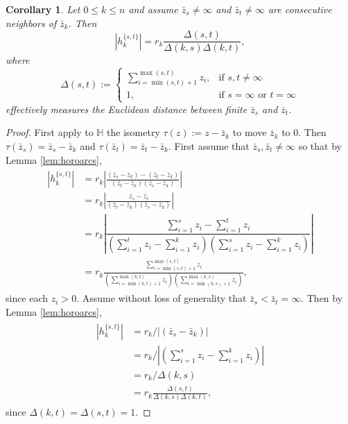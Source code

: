 \documentclass[10pt,a4paper]{article}
\newtheorem{corollary}{Corollary}
\newcommand{\h}[2]{h_{#1}^{\{#2\}}}
\newcommand{\z}[1]{\bar{z}_{#1}}
\newcommand{\len}[1]{\left\lvert #1 \right\rvert}
\begin{document}
\begin{corollary}
\label{cor:horoarcs}
Let $0 \leq k \leq n$ and assume $\z{s} \neq \infty$ and $\z{t} \neq \infty$ are consecutive neighbors of $\z{k}$. Then
\[
    \len{\h{k}{s,t}} = r_k \frac{\Delta(s,t)}{\Delta(k,s)\Delta(k,t)},
\]
where 
\[
    \Delta(s,t) := 
        \begin{cases}
            \displaystyle \sum_{i=\min(s,t)+1}^{\max(s,t)}z_i, & \text{if } s,t \neq  \infty \\
            1, & \text{if } s = \infty \text{ or } t = \infty 
        \end{cases}
\]
effectively measures the Euclidean distance between finite $\z{s}$ and $\z{t}$.
\end{corollary}
\begin{proof}
    First apply to $\mathbb{H}$ the isometry $\tau(z) := z - \z{k}$ to move $\z{k}$ to $0$. Then $\tau(\z{s}) = \z{s} - \z{k}$ and $\tau(\z{t}) = \z{t} - \z{k}$. First assume that $\z{s}, \z{t} \neq \infty$ so that by Lemma \ref{lem:horoarcs}, 
    \begin{align*}
        \begin{aligned}
            \len{\h{k}{s,t}} & = r_k \left\lvert \frac{(\z{s}-\z{k}) - (\z{t}-\z{k})}{(\z{t}-\z{k})(\z{s}-\z{k})} \right\rvert \\
            & = r_k \left\lvert \frac{\z{s} - \z{t}}{(\z{t}-\z{k})(\z{s}-\z{k})} \right\rvert \\
            & = r_k \left\lvert \dfrac{\sum_{i=1}^s z_i-\sum_{i=1}^t z_i}{\left(\sum_{i=1}^t z_i-\sum_{i=1}^k z_i \right)\left(\sum_{i=1}^s z_i-\sum_{i=1}^k z_i \right)} \right\rvert \\
            & = r_k\frac{\sum_{i=\min(s,t)+1}^{\max(s,t)} z_i}{\left(\sum_{i=\min(k,t)+1}^{\max(k,t)} z_i\right)\left(\sum_{i=\min(k,s)+1}^{\max(k,s)} z_i\right)},
        \end{aligned}
    \end{align*}
    since each $z_i > 0$.  Assume without loss of generality that $\z{s} < \z{t} = \infty$. Then by Lemma \ref{lem:horoarcs},
    \begin{align*}
        \begin{aligned}
            \len{\h{k}{s,t}} & = r_k / \left\lvert (\z{s}-\z{k}) \right\rvert \\
            & = r_k / \left\lvert \left(\sum_{i=1}^s z_i-\sum_{i=1}^k z_i \right) \right\rvert \\
            & = r_k / \Delta(k,s)\\
            & = r_k\frac{\Delta(s,t)}{\Delta(k,s)\Delta(k,t)},
        \end{aligned}
    \end{align*}
    since $\Delta(k,t) = \Delta(s,t) = 1$.
\end{proof}
\end{document}
